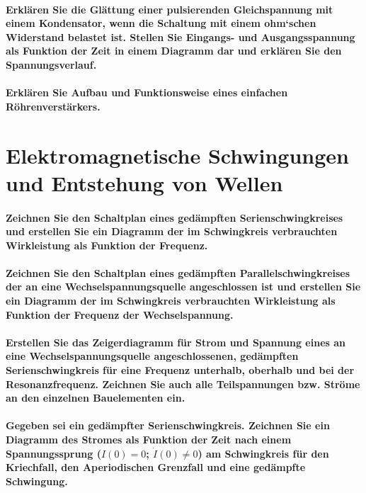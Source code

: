 \documentclass[a4paper, 11pt, parskip=half]{scrartcl}
\begin{document}
\paragraph{Erklären Sie die Glättung einer pulsierenden Gleichspannung mit einem Kondensator, wenn
die Schaltung mit einem ohm‘schen Widerstand belastet ist. Stellen Sie Eingangs- und
Ausgangsspannung als Funktion der Zeit in einem Diagramm dar und erklären Sie den Spannungsverlauf.}

\paragraph{Erklären Sie Aufbau und Funktionsweise eines einfachen Röhrenverstärkers.}

\newpage

\section{Elektromagnetische Schwingungen und Entstehung von Wellen}

\paragraph{Zeichnen Sie den Schaltplan eines gedämpften Serienschwingkreises und erstellen Sie ein
Diagramm der im Schwingkreis verbrauchten Wirkleistung als Funktion der Frequenz.}

\paragraph{Zeichnen Sie den Schaltplan eines gedämpften Parallelschwingkreises der an eine
Wechselspannungsquelle angeschlossen ist und erstellen Sie ein Diagramm der im Schwingkreis
verbrauchten Wirkleistung als Funktion der Frequenz der Wechselspannung.}

\paragraph{Erstellen Sie das Zeigerdiagramm für Strom und Spannung eines an eine
Wechselspannungsquelle angeschlossenen, gedämpften Serienschwingkreis für eine Frequenz unterhalb,
oberhalb und bei der Resonanzfrequenz. Zeichnen Sie auch alle Teilspannungen bzw. Ströme an den
einzelnen Bauelementen ein.}

\paragraph{Gegeben sei ein gedämpfter Serienschwingkreis. Zeichnen Sie ein Diagramm des Stromes als
Funktion der Zeit nach einem Spannungssprung ($I(0)=0$; $\dot{I}(0)\neq 0$) am Schwingkreis für den
Kriechfall, den Aperiodischen Grenzfall und eine gedämpfte Schwingung.}
\end{document}
